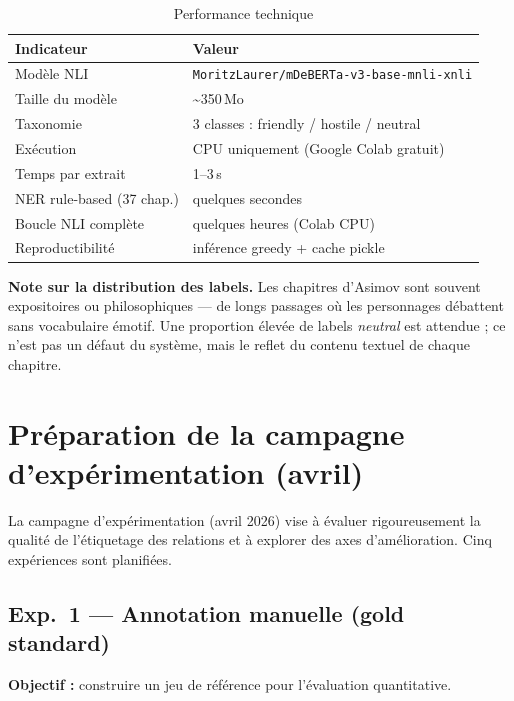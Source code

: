 \documentclass[a4paper,11pt]{article}
\begin{document}
\begin{table}[H]
  \centering
  \small
  \begin{tabular}{ll}
    \toprule
    \textbf{Indicateur} & \textbf{Valeur} \\
    \midrule
    Modèle NLI              & \texttt{MoritzLaurer/mDeBERTa-v3-base-mnli-xnli} \\
    Taille du modèle        & \textasciitilde{}350\,Mo \\
    Taxonomie               & 3 classes : friendly / hostile / neutral \\
    Exécution               & CPU uniquement (Google Colab gratuit) \\
    Temps par extrait       & 1--3\,s \\
    NER rule-based (37 chap.) & quelques secondes \\
    Boucle NLI complète     & quelques heures (Colab CPU) \\
    Reproductibilité        & inférence greedy + cache pickle \\
    \bottomrule
  \end{tabular}
  \caption{Performance technique}
\end{table}

\textbf{Note sur la distribution des labels.} Les chapitres d'Asimov sont souvent expositoires ou
philosophiques — de longs passages où les personnages débattent sans vocabulaire émotif. Une proportion
élevée de labels \textit{neutral} est attendue ; ce n'est pas un défaut du système, mais le reflet
du contenu textuel de chaque chapitre.

\section{Préparation de la campagne d'expérimentation (avril)}

La campagne d'expérimentation (avril 2026) vise à évaluer rigoureusement la qualité de l'étiquetage
des relations et à explorer des axes d'amélioration. Cinq expériences sont planifiées.

\subsection*{Exp.\ 1 — Annotation manuelle (gold standard)}

\textbf{Objectif :} construire un jeu de référence pour l'évaluation quantitative.
\end{document}
